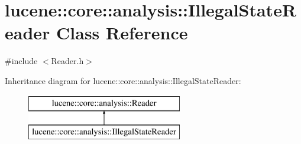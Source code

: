 \hypertarget{classlucene_1_1core_1_1analysis_1_1IllegalStateReader}{}\section{lucene\+:\+:core\+:\+:analysis\+:\+:Illegal\+State\+Reader Class Reference}
\label{classlucene_1_1core_1_1analysis_1_1IllegalStateReader}


{\ttfamily \#include $<$Reader.\+h$>$}

Inheritance diagram for lucene\+:\+:core\+:\+:analysis\+:\+:Illegal\+State\+Reader\+:\begin{figure}[H]
\begin{center}
\leavevmode
\includegraphics[height=2.000000cm]{classlucene_1_1core_1_1analysis_1_1IllegalStateReader}
\end{center}
\end{figure}
